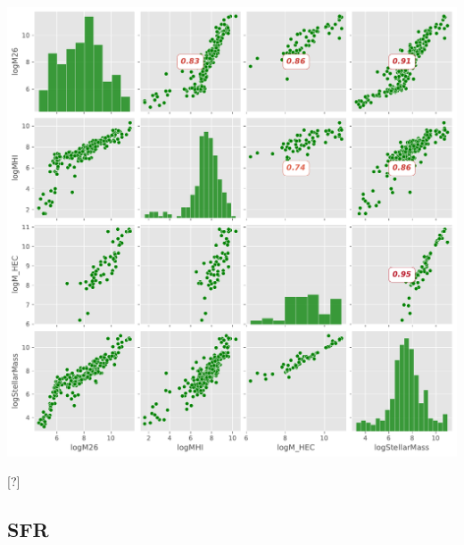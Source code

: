 \documentclass[
]{article}
\begin{document}
\includegraphics{compare_files/figure-pdf/cell-40-output-1.pdf}

{[}?{]}

\subsection{SFR}\label{sfr}
\end{document}
